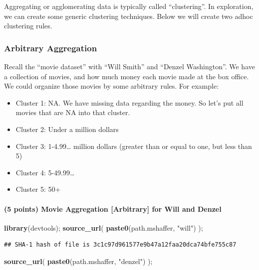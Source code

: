 \documentclass[
]{article}
\newenvironment{Shaded}{\begin{snugshade}}{\end{snugshade}}
\newcommand{\KeywordTok}[1]{\textcolor[rgb]{0.13,0.29,0.53}{\textbf{#1}}}
\newcommand{\NormalTok}[1]{#1}
\newcommand{\StringTok}[1]{\textcolor[rgb]{0.31,0.60,0.02}{#1}}
\providecommand{\tightlist}{%
  \setlength{\itemsep}{0pt}\setlength{\parskip}{0pt}}
\begin{document}
Aggregating or agglomerating data is typically called ``clustering''. In
exploration, we can create some generic clustering techniques. Below we
will create two adhoc clustering rules.

\hypertarget{arbitrary-aggregation}{%
\subsubsection{Arbitrary Aggregation}\label{arbitrary-aggregation}}

Recall the ``movie dataset'' with ``Will Smith'' and ``Denzel
Washington''. We have a collection of movies, and how much money each
movie made at the box office. We could organize those movies by some
arbitrary rules. For example:

\begin{itemize}
\tightlist
\item
  Cluster 1: NA. We have missing data regarding the money. So let's put
  all movies that are NA into that cluster.
\item
  Cluster 2: Under a million dollars
\item
  Cluster 3: 1-4.99\ldots{} million dollars (greater than or equal to
  one, but less than 5)
\item
  Cluster 4: 5-49.99\ldots{}
\item
  Cluster 5: 50+
\end{itemize}

\hypertarget{points-movie-aggregation-arbitrary-for-will-and-denzel}{%
\paragraph{(5 points) Movie Aggregation {[}Arbitrary{]} for Will and
Denzel}\label{points-movie-aggregation-arbitrary-for-will-and-denzel}}

\begin{Shaded}
\begin{Highlighting}[]
\KeywordTok{library}\NormalTok{(devtools);}
\KeywordTok{source\_url}\NormalTok{( }\KeywordTok{paste0}\NormalTok{(path.mshaffer, }\StringTok{"will"}\NormalTok{) );}
\end{Highlighting}
\end{Shaded}

\begin{verbatim}
## SHA-1 hash of file is 3c1c97d961577e9b47a12faa20dca74bfe755c87
\end{verbatim}

\begin{Shaded}
\begin{Highlighting}[]
\KeywordTok{source\_url}\NormalTok{( }\KeywordTok{paste0}\NormalTok{(path.mshaffer, }\StringTok{"denzel"}\NormalTok{) );}
\end{Highlighting}
\end{Shaded}
\end{document}
